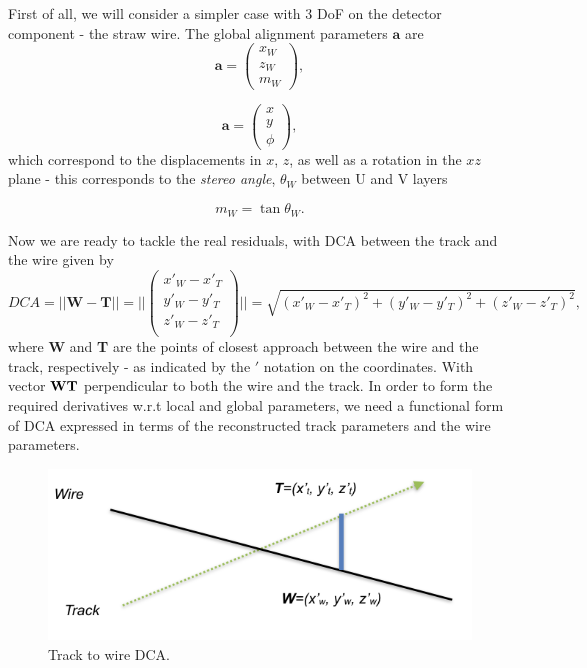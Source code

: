 \documentclass[a4paper,11pt]{article}
\begin{document}
First of all, we will consider a simpler case with 3 DoF on the detector component - the straw wire. The global alignment parameters $\textbf{a}$ are
\begin{equation}
\textbf{a} = \begin{pmatrix}x_W \\z_W \\m_W \end{pmatrix},
\end{equation}

\begin{equation}
\textbf{a} = \begin{pmatrix}x \\y \\\phi \end{pmatrix},
\end{equation}
which correspond to the displacements in $x$, $z$, as well as a rotation in the $xz$ plane - this corresponds to the \textit{stereo angle}, $\theta_W$ between U and V layers

\begin{equation}
	m_W = \tan\theta_W.
\end{equation}

Now we are ready to tackle the real residuals, with DCA between the track and the wire given by
\begin{equation}
DCA = || \textbf{W} - \textbf{T} || = || \begin{pmatrix}x'_W - x'_T\\y'_W - y'_T\\z'_W - z'_T\\\end{pmatrix} || = \sqrt{ (x'_W - x'_T)^2 + (y'_W - y'_T)^2 + (z'_W - z'_T)^2},
\end{equation}
where \textbf{W} and \textbf{T} are the points of closest approach between the wire and the track, respectively - as indicated by the $'$ notation on the coordinates. With vector $\bf{WT}$ perpendicular to both the wire and the track. In order to form the required derivatives w.r.t local and global parameters, we need a functional form of DCA expressed in terms of the reconstructed track parameters and the wire parameters.
\begin{figure}[!ht]
\centering
\includegraphics[width=0.6\linewidth]{fig/WireLine.png}
\caption{Track to wire DCA.}
\label{fig:WireLine}
\end{figure}
\end{document}
